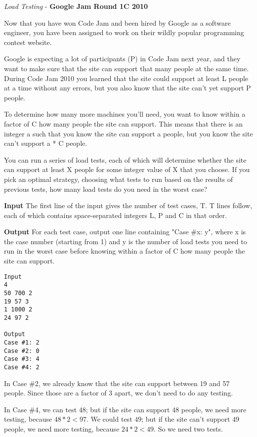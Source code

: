 \begin{solution}
	
	\begin{lstlisting}[language=c++, caption="Store credit c++ solution"]


	\end{lstlisting}
\end{solution}




\begin{problem}{\textit{Load Testing} - \textbf{Google Jam Round 1C 2010}}

Now that you have won Code Jam and been hired by Google as a software engineer, you have been assigned to work on their wildly popular programming contest website.

Google is expecting a lot of participants (P) in Code Jam next year, and they want to make sure that the site can support that many people at the same time. During Code Jam 2010 you learned that the site could support at least L people at a time without any errors, but you also know that the site can't yet support P people.

To determine how many more machines you'll need, you want to know within a factor of C how many people the site can support. This means that there is an integer a such that you know the site can support a people, but you know the site can't support a * C people.

You can run a series of load tests, each of which will determine whether the site can support at least X people for some integer value of X that you choose. If you pick an optimal strategy, choosing what tests to run based on the results of previous tests, how many load tests do you need in the worst case?



\textbf{Input}
The first line of the input gives the number of test cases, T. T lines follow, each of which contains space-separated integers L, P and C in that order.

\textbf{Output}
For each test case, output one line containing "Case \#x: y", where x is the case number (starting from 1) and y is the number of load tests you need to run in the worst case before knowing within a factor of C how many people the site can support.

\begin{framed}
	\begin{verbatim}
Input 
4
50 700 2
19 57 3
1 1000 2
24 97 2

Output 
Case #1: 2
Case #2: 0
Case #3: 4
Case #4: 2
	\end{verbatim}
\end{framed}

In Case \#2, we already know that the site can support between 19 and 57 people. Since those are a factor of 3 apart, we don't need to do any testing.

In Case \#4, we can test 48; but if the site can support 48 people, we need more testing, because $48*2 < 97$. We could test $49$; but if the site can't support $49$ people, we need more testing, because $24 * 2 < 49$. So we need two tests.

\end{problem}

